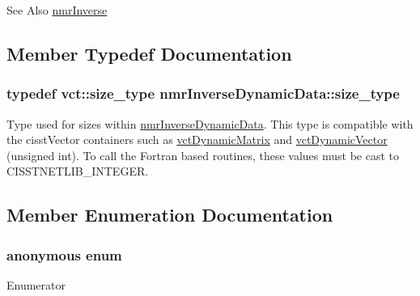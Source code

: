 \begin{DoxySeeAlso}{See Also}
\hyperlink{nmr_inverse_8h_a018d876444a46377abdd85e296643035}{nmr\-Inverse} 
\end{DoxySeeAlso}


\subsection{Member Typedef Documentation}
\hypertarget{classnmr_inverse_dynamic_data_aeb5c2317adf50d8fc7952a9b38bf0129}{
\subsubsection[{size\-\_\-type}]{\setlength{\rightskip}{0pt plus 5cm}typedef {\bf vct\-::size\-\_\-type} {\bf nmr\-Inverse\-Dynamic\-Data\-::size\-\_\-type}}}\label{classnmr_inverse_dynamic_data_aeb5c2317adf50d8fc7952a9b38bf0129}
Type used for sizes within \hyperlink{classnmr_inverse_dynamic_data}{nmr\-Inverse\-Dynamic\-Data}. This type is compatible with the cisst\-Vector containers such as \hyperlink{classvct_dynamic_matrix}{vct\-Dynamic\-Matrix} and \hyperlink{classvct_dynamic_vector}{vct\-Dynamic\-Vector} (unsigned int). To call the Fortran based routines, these values must be cast to C\-I\-S\-S\-T\-N\-E\-T\-L\-I\-B\-\_\-\-I\-N\-T\-E\-G\-E\-R. 

\subsection{Member Enumeration Documentation}
\hypertarget{classnmr_inverse_dynamic_data_ac497be659e1d9db37f098e374260292c}{\subsubsection[{anonymous enum}]{\setlength{\rightskip}{0pt plus 5cm}anonymous enum}}\label{classnmr_inverse_dynamic_data_ac497be659e1d9db37f098e374260292c}
\begin{Desc}
\item[Enumerator]\par
\begin{description}
\item[{\em 
\hypertarget{classnmr_inverse_dynamic_data_ac497be659e1d9db37f098e374260292ca7aa4b91bbfeaafff839f5290659f8067}{N\-B}\label{classnmr_inverse_dynamic_data_ac497be659e1d9db37f098e374260292ca7aa4b91bbfeaafff839f5290659f8067}
}]\end{description}
\end{Desc}


